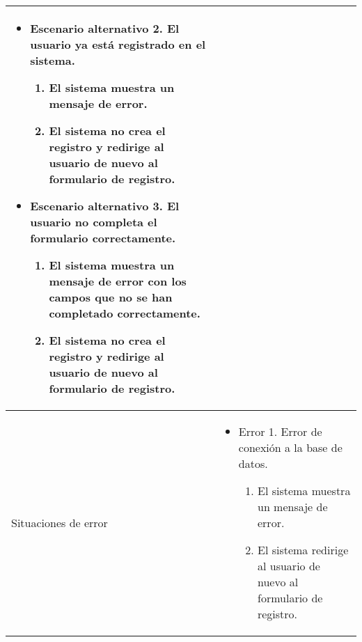 \begin{longtable}{
    >{\columncolor{lightgreen!20}}p{4cm}
    p{12cm}
    }
\begin{itemize}[nosep,leftmargin=*]
\begin{enumerate}[nosep,leftmargin=*]
      \end{enumerate}
      \item Escenario alternativo 2. El usuario ya está registrado en el sistema.
      \begin{enumerate}[nosep,leftmargin=*]
          \item El sistema muestra un mensaje de error.
          \item El sistema no crea el registro y redirige al usuario de nuevo al formulario de registro.
      \end{enumerate}
      \item Escenario alternativo 3. El usuario no completa el formulario correctamente.
      \begin{enumerate}[nosep,leftmargin=*]
          \item El sistema muestra un mensaje de error con los campos que no se han completado correctamente.
          \item El sistema no crea el registro y redirige al usuario de nuevo al formulario de registro.
      \end{enumerate}
    \end{itemize} \\
    \midrule
    Situaciones de error & \begin{itemize}[nosep,leftmargin=*]
      \item Error 1. Error de conexión a la base de datos.
      \begin{enumerate}[nosep,leftmargin=*]
          \item El sistema muestra un mensaje de error.
          \item El sistema redirige al usuario de nuevo al formulario de registro.
      \end{enumerate}
    \end{itemize} \\
    \end{longtable}